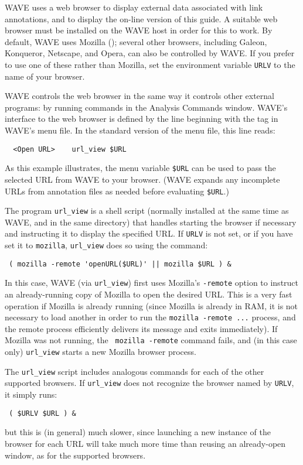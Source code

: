 \documentclass[twoside]{book}
\newcommand{\WAVE}{{\sf WAVE}\xspace}
\begin{document}
\WAVE{} uses a web browser to display external data associated with link
annotations, and to display the on-line version of this guide.  A suitable web
browser must be installed on the \WAVE{} host in order for this to work.  By
default, \WAVE{} uses Mozilla (); several other browsers,
including Galeon, Konqueror, Netscape, and Opera, can also be controlled by
\WAVE{}.  If you prefer to use one of these rather than Mozilla, set the
environment variable {\tt URLV} to the name of your browser.

\WAVE{} controls the web browser in the same way it controls other
external programs:  by running commands in the {\sf Analysis Commands}
window.  \WAVE{}'s interface to the web browser is defined by the
line beginning with the {\tt <Open URL>} tag in \WAVE{}'s menu
file.  In the standard version of the menu file, this line reads:
\begin{verbatim}
  <Open URL>    url_view $URL
\end{verbatim}
\noindent
As this example illustrates, the menu variable {\tt \$URL} can be used
to pass the selected URL from \WAVE{} to your browser.  (\WAVE{}
expands any incomplete URLs from annotation files as needed before
evaluating {\tt \$URL}.)

The program {\tt url\_view} is a shell script (normally installed at the
same time as \WAVE{}, and in the same directory) that handles starting
the browser if necessary and instructing it to display the specified
URL.  If {\tt URLV} is not set, or if you have set it to {\tt mozilla},
{\tt url\_view} does so using the command:
\begin{verbatim}
 ( mozilla -remote 'openURL($URL)' || mozilla $URL ) &
\end{verbatim}
\noindent
In this case, \WAVE{} (via {\tt url\_view}) first uses Mozilla's
{\tt -remote} option to instruct an already-running copy of Mozilla
to open the desired URL.  This is a very fast operation if Mozilla is
already running (since Mozilla is already in RAM, it is not necessary
to load another in order to run the {\tt mozilla -remote ...}
process, and the remote process efficiently delivers its message and
exits immediately).  If Mozilla was not running, the {\tt
mozilla -remote} command fails, and (in this case only) {\tt url\_view}
starts a new Mozilla browser process.

The {\tt url\_view} script includes analogous commands for each of the other
supported browsers.  If {\tt url\_view} does not recognize the browser named by
{\tt URLV}, it simply runs:
\begin{verbatim}
 ( $URLV $URL ) &
\end{verbatim}
\noindent
but this is (in general) much slower, since launching a new instance of the
browser for each URL will take much more time than reusing an already-open
window, as for the supported browsers.
\end{document}
